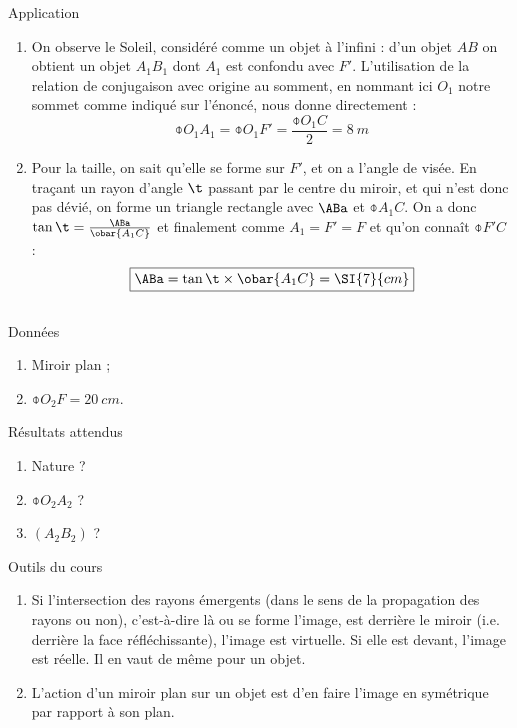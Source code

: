 \documentclass[10pt,notitlepage]{book}
\begin{document}
\begin{NCexem}{Application}
    \begin{enumerate}
        \item On observe le Soleil, considéré comme un objet à l'infini : d'un
            objet $AB$ on obtient un objet $A_1B_1$ dont $A_1$ est confondu avec
            $F'$.  L'utilisation de la relation de conjugaison avec origine au
            somment, en nommant ici $O_1$ notre sommet comme indiqué sur
            l'énoncé, nous donne directement : \[ \boxed{\obar{O_1A_1} =
            \obar{O_1F'} = \frac{\obar{O_1C}}{2} = \SI{8}{m}} \]

        \item Pour la taille, on sait qu'elle se forme sur $F'$, et on a l'angle
            de visée. En traçant un rayon d'angle $\t$ passant par le centre du
            miroir, et qui n'est donc pas dévié, on forme un triangle rectangle
            avec $\ABa$ et $\obar{A_1C}$. On a donc $\tan\t =
            \frac{\ABa}{\obar{A_1C}}$ et finalement comme $A_1 = F' = F$ et
            qu'on connaît $\obar{F'C}$ :
            \[ \boxed{\ABa = \tan\t\times\obar{A_1C} = \SI{7}{cm}} \]
    \end{enumerate}
\end{NCexem}

\subsection{}

\begin{NCdefi}{Données}
    \begin{enumerate}
        \item Miroir plan ;
        \item $\obar{O_2F} = \SI{20}{cm}$.
    \end{enumerate}
\end{NCdefi}

\begin{NCprop}{Résultats attendus}
    \begin{enumerate}
        \item Nature ?
        \item $\obar{O_2A_2}$ ?
        \item $\left( A_2B_2 \right)$ ?
    \end{enumerate}
\end{NCprop}

\begin{NCdemo}{Outils du cours}
    \begin{enumerate}
        \item Si l'intersection des rayons émergents (dans le sens de la
            propagation des rayons ou non), c'est-à-dire là ou se forme l'image,
            est derrière le miroir (i.e. derrière la face réfléchissante),
            l'image est virtuelle. Si elle est devant, l'image est réelle. Il en
            vaut de même pour un objet.
        \item L'action d'un miroir plan sur un objet est d'en faire l'image en
            symétrique par rapport à son plan.
    \end{enumerate}
\end{NCdemo}
\end{document}
